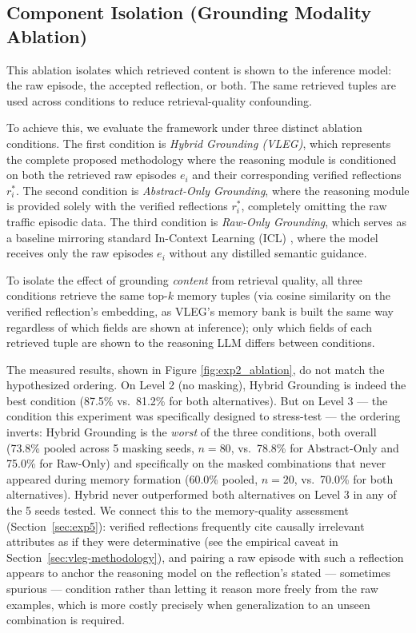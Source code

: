 \subsection{Component Isolation (Grounding Modality Ablation)}
\label{sec:exp2}

This ablation isolates which retrieved content is shown to the inference model: the raw episode, the accepted reflection, or both. The same retrieved tuples are used across conditions to reduce retrieval-quality confounding.

To achieve this, we evaluate the framework under three distinct ablation conditions. The first condition is \textit{Hybrid Grounding (VLEG)}, which represents the complete proposed methodology where the reasoning module is conditioned on both the retrieved raw episodes $e_i$ and their corresponding verified reflections $r_i^*$. The second condition is \textit{Abstract-Only Grounding}, where the reasoning module is provided solely with the verified reflections $r_i^*$, completely omitting the raw traffic episodic data. The third condition is \textit{Raw-Only Grounding}, which serves as a baseline mirroring standard In-Context Learning (ICL) \cite{brown2020language}, where the model receives only the raw episodes $e_i$ without any distilled semantic guidance.

To isolate the effect of grounding \emph{content} from retrieval quality, all three conditions retrieve the same top-$k$ memory tuples (via cosine similarity on the verified reflection's embedding, as VLEG's memory bank is built the same way regardless of which fields are shown at inference); only which fields of each retrieved tuple are shown to the reasoning LLM differs between conditions.

The measured results, shown in Figure \ref{fig:exp2_ablation}, do not match the hypothesized ordering. On Level 2 (no masking), Hybrid Grounding is indeed the best condition (87.5\% vs.\ 81.2\% for both alternatives). But on Level 3 --- the condition this experiment was specifically designed to stress-test --- the ordering inverts: Hybrid Grounding is the \emph{worst} of the three conditions, both overall (73.8\% pooled across 5 masking seeds, $n=80$, vs.\ 78.8\% for Abstract-Only and 75.0\% for Raw-Only) and specifically on the masked combinations that never appeared during memory formation (60.0\% pooled, $n=20$, vs.\ 70.0\% for both alternatives). Hybrid never outperformed both alternatives on Level 3 in any of the 5 seeds tested. We connect this to the memory-quality assessment (Section~\ref{sec:exp5}): verified reflections frequently cite causally irrelevant attributes as if they were determinative (see the empirical caveat in Section~\ref{sec:vleg-methodology}), and pairing a raw episode with such a reflection appears to anchor the reasoning model on the reflection's stated --- sometimes spurious --- condition rather than letting it reason more freely from the raw examples, which is more costly precisely when generalization to an unseen combination is required.

